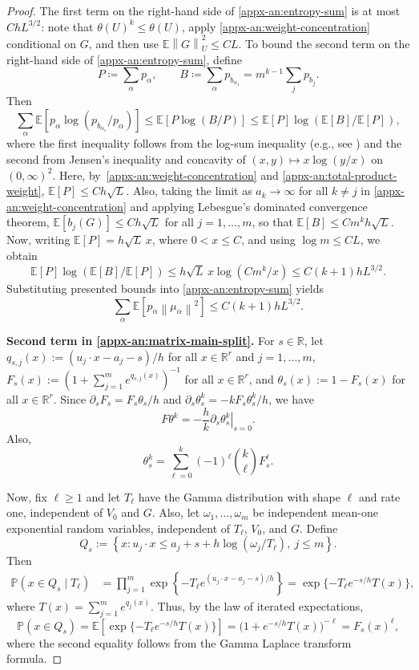 \documentclass[11pt,letterpaper]{article}
\theoremstyle{remark}
\newcommand{\E}{\mathbb E}
\newcommand{\Pp}{\mathbb P}
\newcommand{\R}{\mathbb R}
\newcommand{\norm}[1]{\left\lVert#1\right\rVert}
\begin{document}
\begin{proof}
The first term on the right-hand side of \eqref{appx-an:entropy-sum} is at most
$ChL^{3/2}$: note that $\theta(U)^k \leq \theta(U)$, apply
\eqref{appx-an:weight-concentration} conditional on $G$, and then use $\E\norm G_U^2\le CL$.
To bound the second term on the right-hand side of \eqref{appx-an:entropy-sum}, 
define
\[
 P\coloneqq\sum_\alpha p_\alpha,\qquad
 B\coloneqq\sum_\alpha p_{b_{\alpha_1}}
 =m^{k-1}\sum_j p_{b_j}.
\]
Then
\[
 \sum_\alpha \E [p_\alpha
 \log(p_{b_{\alpha_1}}/p_\alpha)]
 \le \E[P\log(B/P)]
 \le \E[P]\log(\E[B]/\E[P]),
\]
where the first inequality follows from the log-sum inequality (e.g., see \cite[Theorem~2.7.1]{CoverThomas2006}) and the second from Jensen's inequality and concavity of $(x,y)\mapsto x\log(y/x)$ on $(0,\infty)^2$.
Here, by~\eqref{appx-an:weight-concentration} and \eqref{appx-an:total-product-weight}, $\E[P] \le Ch\sqrt L$. Also, taking the limit as $a_k\to\infty$ for all $k\neq j$ in \eqref{appx-an:weight-concentration} and applying Lebesgue's dominated convergence theorem, $\E[b_j(G)] \leq Ch\sqrt L$ for all $j=1,\dots, m$, so that  $\E[B] \le Cm^kh\sqrt L$.
Now, writing $\E[P] =h\sqrt L\,x$, where $0<x\le C$,
and using $\log m\le CL$, we obtain
\[
 \E[P]\log(\E[B]/\E[P])
 \le h\sqrt L\,x\log(Cm^k/x)
 \le C(k+1)hL^{3/2}.
\]
Substituting presented bounds into \eqref{appx-an:entropy-sum} yields
\begin{equation}
  \sum_\alpha \E[p_\alpha\norm{\mu_\alpha}^2]
 \le C(k+1)hL^{3/2}.
 \label{appx-an:tilted-mean-bound}
\end{equation}

{\bf Second term in \eqref{appx-an:matrix-main-split}.} 
For $s\in\R$, let $q_{s, j}(x) := (u_j\cdot x - a_j - s) / h$ for all $x\in\R^r$ and $j=1,\dots, m$, $F_s(x) := (1 + \sum_{j=1}^m e^{q_{s, j}(x)})^{-1}$ for all $x\in\R^r$, and $\theta_s(x) := 1 - F_s(x)$ for all $x\in\R^r$.
Since
\( \partial_s F_s= F_s\theta_s/h\) and \(\partial_s\theta_s^k=-kF_s\theta_s^k/h\),
we have
\[
 F\theta^k=-\frac hk
 \left.\partial_s\theta_s^k\right|_{s=0}.
\]
Also,
\[
 \theta_s^k
 =\sum_{\ell=0}^k(-1)^\ell\binom{k}{\ell}F_s^\ell.
\]

Now, fix $\ell\ge1$ and let $T_\ell$ have the Gamma
distribution with shape $\ell$ and rate one, independent of $V_0$ and $G$. Also, let $\omega_1,\ldots,\omega_m$ be independent mean-one exponential random variables, independent of $T_\ell$, $V_0$, and $G$.
Define
\[
 Q_s :=\left\{x:
 u_j\cdot x\le a_j+s+h\log(\omega_j/T_\ell),
 \ j\le m\right\}.
\]
Then
\[
 \begin{aligned}
 \Pp(x\in Q_s\mid T_\ell)
 &=\prod_{j=1}^m
 \exp\left\{-T_\ell
 e^{(u_j\cdot x-a_j-s)/h}\right\}
 =\exp\{-T_\ell e^{-s/h}T(x)\},
 \end{aligned}
\]
where $T(x) = \sum_{j=1}^m e^{q_j(x)}$. Thus, by the law of iterated expectations,
\begin{equation}
\Pp(x\in Q_s) = \E[\exp\{-T_\ell e^{-s/h}T(x)\}] = \bigl(1+e^{-s/h}T(x)\bigr)^{-\ell} = F_s(x)^\ell,
 \label{appx-an:gamma-mixture}
\end{equation}
where the second equality follows from the Gamma Laplace transform formula.


\end{proof}
\end{document}
